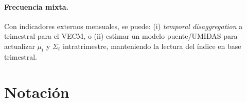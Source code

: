 \documentclass[11pt,a4paper]{article}
\newcommand{\1}{\mathbf{1}}
\begin{document}
\paragraph{Frecuencia mixta.}
Con indicadores externos mensuales, se puede: (i) \emph{temporal disaggregation} a trimestral para el VECM, o (ii) estimar un modelo puente/UMIDAS para actualizar $\mu_t$ y \(\Sigma_t\) intratrimestre, manteniendo la lectura del índice en base trimestral.


\appendix

\section{Notación}
\label{app:notation}
\end{document}
